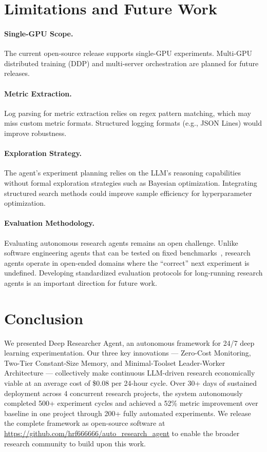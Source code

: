 \section{Limitations and Future Work}
\label{sec:limitations}

\paragraph{Single-GPU Scope.} The current open-source release supports single-GPU experiments. Multi-GPU distributed training (DDP) and multi-server orchestration are planned for future releases.

\paragraph{Metric Extraction.} Log parsing for metric extraction relies on regex pattern matching, which may miss custom metric formats. Structured logging formats (e.g., JSON Lines) would improve robustness.

\paragraph{Exploration Strategy.} The agent's experiment planning relies on the LLM's reasoning capabilities without formal exploration strategies such as Bayesian optimization. Integrating structured search methods could improve sample efficiency for hyperparameter optimization.

\paragraph{Evaluation Methodology.} Evaluating autonomous research agents remains an open challenge. Unlike software engineering agents that can be tested on fixed benchmarks~\cite{swe-agent}, research agents operate in open-ended domains where the ``correct'' next experiment is undefined. Developing standardized evaluation protocols for long-running research agents is an important direction for future work.

\section{Conclusion}
\label{sec:conclusion}

We presented Deep Researcher Agent, an autonomous framework for 24/7 deep learning experimentation. Our three key innovations --- Zero-Cost Monitoring, Two-Tier Constant-Size Memory, and Minimal-Toolset Leader-Worker Architecture --- collectively make continuous LLM-driven research economically viable at an average cost of \$0.08 per 24-hour cycle. Over 30+ days of sustained deployment across 4 concurrent research projects, the system autonomously completed 500+ experiment cycles and achieved a 52\% metric improvement over baseline in one project through 200+ fully automated experiments. We release the complete framework as open-source software at \url{https://github.com/hrf666666/auto_research_agent} to enable the broader research community to build upon this work.
